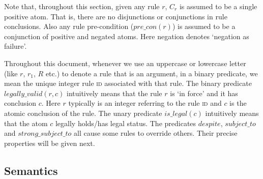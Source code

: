 Note that, throughout this section, given any rule $r$, $C_{r}$ is assumed to be a single positive atom. That is, there are no disjunctions or conjunctions in rule conclusions. Also any rule pre-condition ($pre\_con(r)$) is assumed to be a conjunction of positive and negated atoms. Here negation denotes `negation as failure'.  

Throughout this document, whenever we use an uppercase or lowercase letter (like $r$, $r_{1}$, $R$ etc.) to denote a rule that is an argument, in a binary predicate, we mean the unique integer rule \textsc{id} associated with that rule. The binary predicate $legally\_valid(r,c)$ intuitively means that the rule $r$ is `in force' and it has conclusion $c$. Here $r$ typically is an integer referring to the rule \textsc{id} and $c$ is the atomic conclusion of the rule. The unary predicate $is\_legal(c)$ intuitively means that the atom $c$ legally holds/has legal status. The predicates $despite$, $subject\_to$ and $strong\_subject\_to$ all cause some rules to override others. Their precise properties will be given next.


\subsection{Semantics}


